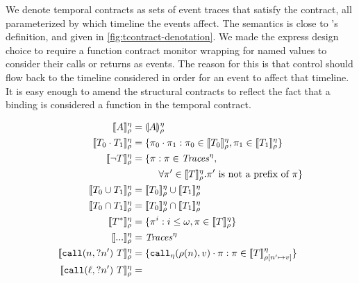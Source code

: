 \documentclass[preprint,onecolumn,9pt]{sigplanconf} %
\begin{document}
We denote temporal contracts as sets of event traces that satisfy the contract, all parameterized by which timeline the events affect.
%
The semantics is close to \citeauthor{ianjohnson:dfm:icfp2011}'s definition, and given in \autoref{fig:tcontract-denotation}.
%
We made the express design choice to require a function contract monitor wrapping for named values to consider their calls or returns as events.
%
The reason for this is that control should flow back to the timeline considered in order for an event to affect that timeline.
%
It is easy enough to amend the structural contracts to reflect the fact that a binding is considered a function in the temporal contract.
\begin{figure}
  \begin{align*}
   \denotetcon{\mevent}{\mtimeline}{\menv} &=
   \denoteevent{\mevent}{\menv}{\mtimeline}
\\
   \denotetcon{\stseq{\mtcon_0}{\mtcon_1}}{\mtimeline}{\menv} &=
   \setbuild{\mtrace_0 \cdot \mtrace_1}{\mtrace_0 \in \denotetcon{\mtcon_0}{\mtimeline}{\menv}, \mtrace_1 \in \denotetcon{\mtcon_1}{\mtimeline}{\menv}}
\\   
   \denotetcon{\stnot{\mtcon}}{\mtimeline}{\menv} &=
    \setbuild{\mtrace}{\mtrace \in \Traces^\mtimeline, \\
                      &\phantom{= \{ \mtrace : } \forall \mtrace' \in \denotetcon{\mtcon}{\mtimeline}{\menv}. \mtrace' \text{ is not a prefix of } \mtrace}
\\
   \denotetcon{\stOr{\mtcon_0}{\mtcon_1}}{\mtimeline}{\menv} &=
   \denotetcon{\mtcon_0}{\mtimeline}{\menv} \cup \denotetcon{\mtcon_1}{\mtimeline}{\menv}
\\
   \denotetcon{\stAnd{\mtcon_0}{\mtcon_1}}{\mtimeline}{\menv} &=
   \denotetcon{\mtcon_0}{\mtimeline}{\menv} \cap \denotetcon{\mtcon_1}{\mtimeline}{\menv}
\\
   \denotetcon{\stmany{\mtcon}}{\mtimeline}{\menv} &=
   \setbuild{\mtrace^i}{i \le \omega, \mtrace \in \denotetcon{\mtcon}{\mtimeline}{\menv}}
\\
   \denotetcon{\sddd}{\mtimeline}{\menv} &=
   \Traces^\mtimeline
\\
   \denotetcon{\stcall{\mname}{\mname'}{\mtcon}}{\mtimeline}{\menv} &=
   \setbuild{\apvcall{\menv(\mname)}{\mval}{\mtimeline}\cdot \mtrace}{\mtrace \in \denotetcon{\mtcon}{\mtimeline}{\menv[\mname' \mapsto \mval]}}
\\
   \denotetcon{\stcall{\mtoplevelname}{\mname'}{\mtcon}}{\mtimeline}{\menv} &=

\end{align*}
\end{figure}
\end{document}
